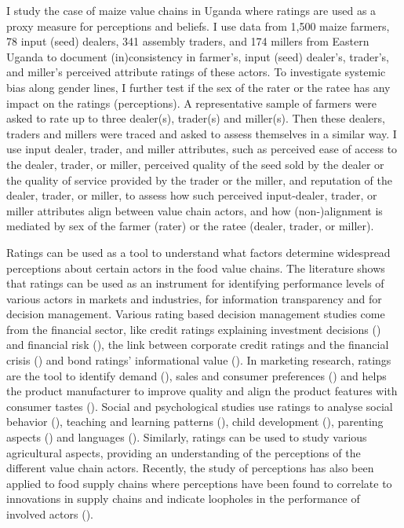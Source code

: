 \documentclass[12pt,english]{article}\usepackage[]{graphicx}\usepackage[]{color}
\begin{document}
\begin{onehalfspace}
I study the case of maize value chains in Uganda where ratings are
used as a proxy measure for perceptions and beliefs. I use data from
1,500 maize farmers, 78 input (seed) dealers, 341 assembly traders,
and 174 millers from Eastern Uganda to document (in)consistency in
farmer's, input (seed) dealer's, trader's, and miller's perceived
attribute ratings of these actors. To investigate systemic bias along
gender lines, I further test if the sex of the rater or the ratee
has any impact on the ratings (perceptions). A representative sample
of farmers were asked to rate up to three dealer(s), trader(s) and
miller(s). Then these dealers, traders and millers were traced and
asked to assess themselves in a similar way. I use input dealer, trader,
and miller attributes, such as perceived ease of access to the dealer,
trader, or miller, perceived quality of the seed sold by the dealer
or the quality of service provided by the trader or the miller, and
reputation of the dealer, trader, or miller, to assess how such perceived
input-dealer, trader, or miller attributes align between value chain
actors, and how (non-)alignment is mediated by sex of the farmer (rater)
or the ratee (dealer, trader, or miller).

Ratings can be used as a tool to understand what factors determine
widespread perceptions about certain actors in the food value chains.
The literature shows that ratings can be used as an instrument for
identifying performance levels of various actors in markets and industries,
for information transparency \citep{Karminsky2016} and for decision
management. Various rating based decision management studies come
from the financial sector, like credit ratings explaining investment
decisions (\citealp{Bolton2012}) and financial risk (\citealp{karminsky2009ratings}),
the link between corporate credit ratings and the financial crisis
(\citealp{deHaan2017}) and bond ratings' informational value (\citealp{Kliger2000}).
In marketing research, ratings are the tool to identify demand (\citealp{Dhar2016}),
sales and consumer preferences (\citealp{Sun2012}) and helps the
product manufacturer to improve quality and align the product features
with consumer tastes (\citealp{Cheung2003,Barton2006}). Social and
psychological studies use ratings to analyse social behavior (\citealp{Renk2004,Schofield2007}),
teaching and learning patterns (\citealp{Feldman2007}), child development
(\citealp{Bukowski2012}), parenting aspects (\citealp{Kuppens2009})
and languages (\citealp{Rudell1993,Cole2019}). Similarly, ratings
can be used to study various agricultural aspects, providing an understanding
of the perceptions of the different value chain actors. Recently,
the study of perceptions has also been applied to food supply chains
where perceptions have been found to correlate to innovations in supply
chains and indicate loopholes in the performance of involved actors
(\citealp{Ola2020,Odongo2016}).


\end{onehalfspace}
\end{document}

